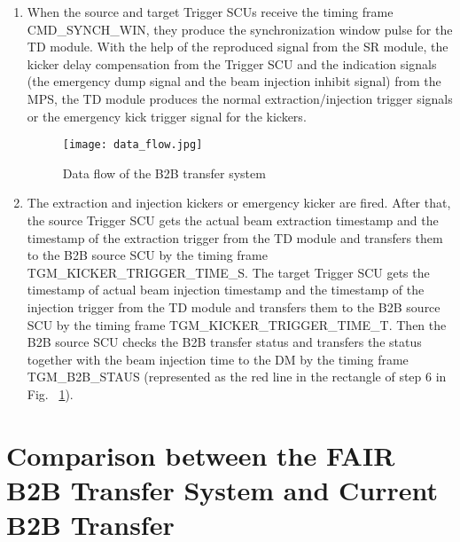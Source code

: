 \begin{enumerate}
\item  When the source and target Trigger SCUs receive the timing frame CMD\_SYNCH\_WIN, they produce the synchronization window pulse for the TD module. With the help of the reproduced signal from the SR module, the kicker delay compensation from the Trigger SCU and the indication signals (the emergency dump signal and the beam injection inhibit signal) from the MPS, the TD module produces the normal extraction/injection trigger signals or the emergency kick trigger signal for the kickers.  
\begin{figure}[H]
   \centering   
   \texttt{[image: data\_flow.jpg]}
   \caption{Data flow of the B2B transfer system}
   \label{data_flow}
\end{figure}  
\item  The extraction and injection kickers or emergency kicker are fired. After that, the source Trigger SCU gets the actual beam extraction timestamp and the timestamp of the extraction trigger from the TD module and transfers them to the B2B source SCU by the timing frame TGM\_KICKER\_TRIGGER\_TIME\_S. The target Trigger SCU gets the timestamp of actual beam injection timestamp and the timestamp of the injection trigger from the TD module and transfers them to the B2B source SCU by the timing frame TGM\_KICKER\_TRIGGER\_TIME\_T. Then the B2B source SCU checks the B2B transfer status and transfers the status together with the beam injection time to the DM by the timing frame TGM\_B2B\_STAUS (represented as the red line in the rectangle of step 6 in Fig. ~\ref{data_flow}).

\end{enumerate}

\section{Comparison between the FAIR B2B Transfer System and Current B2B Transfer}
\label{cpt_comp}


